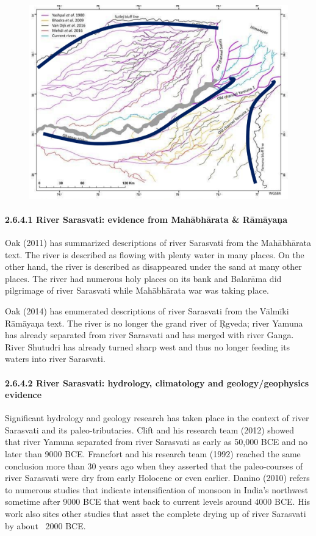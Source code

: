 \begin{figure}[!htbp]
\includegraphics[scale=0.25]{images/8-20.jpg}
\caption{}\label{art8-fig20}
\end{figure}


\paragraph*{2.6.4.1 River Sarasvati: evidence from Mahābhārata \& Rāmāyaņa}

Oak (2011) has summarized descriptions of river Sarasvati from the Mahābhārata text. The river is described as flowing with plenty water in many places. On the other hand, the river is described as disappeared under the sand at many other places. The river had numerous holy places on its bank and Balarāma did pilgrimage of river Sarasvati while Mahābhārata war was taking place.

Oak (2014) has enumerated descriptions of river Sarasvati from the Vālmīki Rāmāyaņa text. The river is no longer the grand river of Ṛgveda; river Yamuna has already separated from river Sarasvati and has merged with river Ganga. River Shutudri has already turned sharp west and thus no longer feeding its waters into river Sarasvati.


\paragraph*{2.6.4.2 River Sarasvati: hydrology, climatology and geology/\break geophysics evidence}

Significant hydrology and geology research has taken place in the context of river Sarasvati and its paleo-tributaries. Clift and his research team (2012) showed that river Yamuna separated from river Sarasvati as early as 50,000 BCE and no later than 9000 BCE. Francfort and his research team (1992) reached the same conclusion more than 30 years ago when they asserted that the paleo-courses of river Sarasvati were dry from early Holocene or even earlier. Danino (2010) refers to numerous studies that indicate intensification of monsoon in India’s northwest sometime after 9000 BCE that went back to current levels around 4000 BCE. His work also sites other studies that asset the complete drying up of river Sarasvati by about ~2000 BCE.


